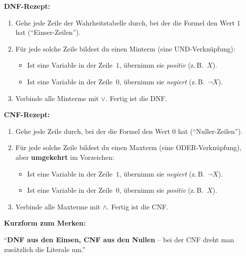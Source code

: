 \documentclass[a4paper,12pt]{article}
\begin{document}
\begin{merkbox}[title={Strategie: Wahrheitstabelle $\to$ DNF}]
\textbf{DNF-Rezept:}
\begin{enumerate}[nosep]
\item Gehe jede Zeile der Wahrheitstabelle durch, bei der die Formel
      den Wert $1$ hat ("`Einser-Zeilen"').
\item F\"ur jede solche Zeile bildest du einen Minterm (eine
      UND-Verkn\"upfung):
      \begin{itemize}[nosep]
      \item Ist eine Variable in der Zeile~$1$, \"ubernimm sie
            \emph{positiv} (z.\,B.\ $X$).
      \item Ist eine Variable in der Zeile~$0$, \"ubernimm sie
            \emph{negiert} (z.\,B.\ $\neg X$).
      \end{itemize}
\item Verbinde alle Minterme mit $\vee$. Fertig ist die DNF.
\end{enumerate}
\end{merkbox}

\begin{merkbox}[title={Strategie: Wahrheitstabelle $\to$ CNF}]
\textbf{CNF-Rezept:}
\begin{enumerate}[nosep]
\item Gehe jede Zeile durch, bei der die Formel den Wert $0$ hat
      ("`Nuller-Zeilen"').
\item F\"ur jede solche Zeile bildest du einen Maxterm (eine
      ODER-Verkn\"upfung), aber \textbf{umgekehrt} im Vorzeichen:
      \begin{itemize}[nosep]
      \item Ist eine Variable in der Zeile~$1$, \"ubernimm sie
            \emph{negiert} (z.\,B.\ $\neg X$).
      \item Ist eine Variable in der Zeile~$0$, \"ubernimm sie
            \emph{positiv} (z.\,B.\ $X$).
      \end{itemize}
\item Verbinde alle Maxterme mit $\wedge$. Fertig ist die CNF.
\end{enumerate}
\end{merkbox}

\begin{merkbox}
\textbf{Kurzform zum Merken:}
\begin{center}
"`\textbf{DNF aus den Einsen, CNF aus den Nullen} -- bei der CNF
dreht man zus\"atzlich die Literale um."'
\end{center}
\end{merkbox}
\end{document}
